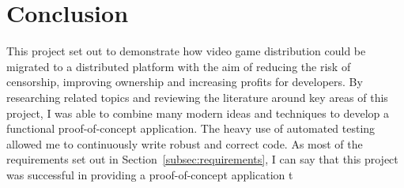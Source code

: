 \section{Conclusion}

This project set out to demonstrate how video game distribution could be migrated to a distributed platform with the aim of reducing the risk of censorship, improving ownership and increasing profits for developers.
\x
By researching related topics and reviewing the literature around key areas of this project, I was able to combine many modern ideas and techniques to develop a functional proof-of-concept application. The heavy use of automated testing allowed me to continuously write robust and correct code.
\x
As most of the requirements set out in Section~\ref{subsec:requirements}, I can say that this project was successful in providing a proof-of-concept application t